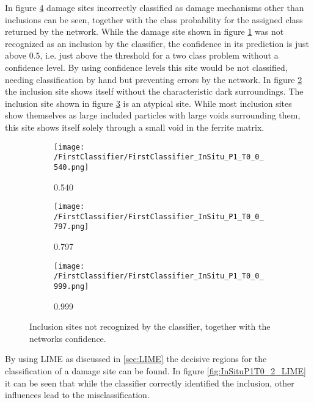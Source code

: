 In figure \ref{fig:FirstClassifierInSituP1T0} damage sites incorrectly classified as damage mechanisms other than inclusions can be seen, together with the class probability for the assigned class returned by the network. While the damage site shown in figure \ref{sub:InSituP1T10_1} was not recognized as an inclusion by the classifier, the confidence in its prediction is just above $0.5$, i.e. just above the threshold for a two class problem without a confidence level. By using confidence levels this site would be not classified, needing classification by hand but preventing errors by the network. In figure \ref{sub:InSituP1T0_2} the inclusion site shows itself without the characteristic dark surroundings. The inclusion site shown in figure \ref{sub:InSituP1T0_3} is an atypical site. While most inclusion sites show themselves as large included particles with large voids surrounding them, this site shows itself solely through a small void in the ferrite matrix. \\
\begin{figure}[H]
\centering
\begin{subfigure}{.3\textwidth}
\texttt{[image: /FirstClassifier/FirstClassifier\_InSitu\_P1\_T0\_0\_540.png]}
\caption{0.540}
\label{sub:InSituP1T10_1}
\end{subfigure}
\centering
\begin{subfigure}{.3\textwidth}
\texttt{[image: /FirstClassifier/FirstClassifier\_InSitu\_P1\_T0\_0\_797.png]}
\caption{0.797}
\label{sub:InSituP1T0_2}
\end{subfigure}
\centering
\begin{subfigure}{.3\textwidth}
\texttt{[image: /FirstClassifier/FirstClassifier\_InSitu\_P1\_T0\_0\_999.png]}
\caption{0.999}
\label{sub:InSituP1T0_3}
\end{subfigure}
\caption{Inclusion sites not recognized by the classifier, together with the networks confidence.}
\label{fig:FirstClassifierInSituP1T0}
\end{figure}

By using LIME as discussed in \ref{sec:LIME} the decisive regions for the classification of a damage site can be found. In figure \ref{fig:InSituP1T0_2_LIME} it can be seen that while the classifier correctly identified the inclusion, other influences lead to the misclassification. \\


